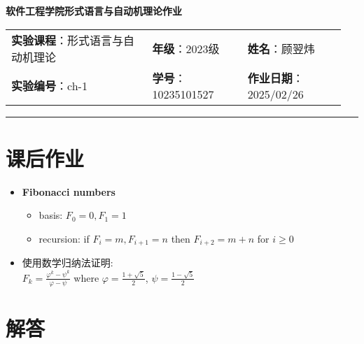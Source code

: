 \documentclass{article}
\begin{document}
	
	\begin{center}
		{\Large{\textbf{\heiti 软件工程学院形式语言与自动机理论作业}}}
		\begin{table}[htb]
			\flushleft
			\begin{tabular}{p{0.4\linewidth}p{0.27\linewidth}p{0.28\linewidth}}\\
				\textbf{实验课程}：形式语言与自动机理论  & \textbf{年级}：2023级       & \textbf{姓名}：顾翌炜  \\
				\textbf{实验编号}：ch-1    & \textbf{学号}：10235101527 & \textbf{作业日期}：2025/02/26  \\
			\end{tabular}
		\end{table}
	\end{center}
	\rule{\textwidth}{2pt}
	
	\section*{课后作业}
	
	\begin{itemize}
		\item \textbf{Fibonacci numbers}
		\begin{itemize}
			\item basis: $F_0 = 0, F_1 = 1$
			\item recursion: if $F_i = m, F_{i+1} = n$ then $F_{i+2} = m + n$ for $i \geq 0$
		\end{itemize}
		\item 使用数学归纳法证明: \\
		$F_k = \frac{\varphi^k - \psi^k}{\varphi - \psi}$ where $\varphi = \frac{1 + \sqrt{5}}{2}$, $\psi = \frac{1 - \sqrt{5}}{2}$
	\end{itemize}
	
	\section*{解答}
	
\end{document}
